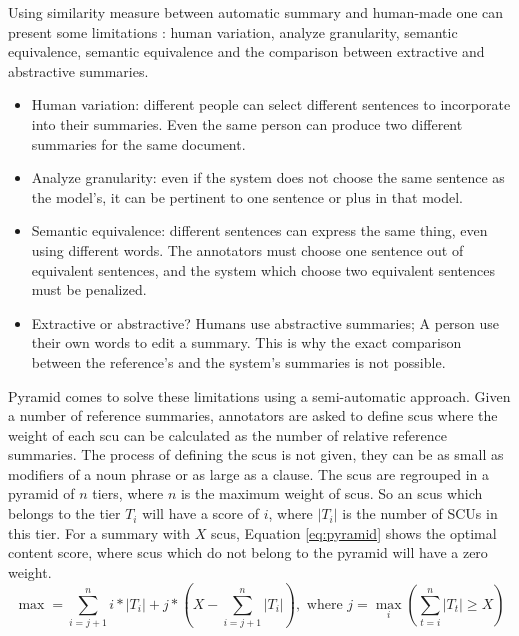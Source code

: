 Using similarity measure between automatic summary and human-made one can present some limitations \citep{07-nenkova-al}:
human variation, analyze granularity, semantic equivalence, semantic equivalence and the comparison between extractive and abstractive summaries.
\begin{itemize}
	\item Human variation: different people can select different sentences to incorporate into their summaries. 
	Even the same person can produce two different summaries for the same document.
	
	\item Analyze granularity: even if the system does not choose the same sentence as the model's, it can be pertinent to one sentence or plus in that model.
	
	\item Semantic equivalence: different sentences can express the same thing, even using different words.
	The annotators must choose one sentence out of equivalent sentences, and the system which choose two equivalent sentences must be penalized.
	
	\item Extractive or abstractive? Humans use abstractive summaries; A person use their own words to edit a summary.
	This is why the exact comparison between the reference's and the system's summaries is not possible.
	
\end{itemize}
Pyramid \citep{07-nenkova-al} comes to solve these limitations using a semi-automatic approach. 
Given a number of reference summaries, annotators are asked to define \acp{scu} where the weight of each \ac{scu} can be calculated as the number of relative reference summaries. 
The process of defining the \acp{scu} is not given, they can be as small as modifiers of a noun phrase or as large as a clause. 
The \acp{scu} are regrouped in a pyramid of $ n $ tiers, where $ n $ is the maximum weight of \acp{scu}. 
So an \acp{scu} which belongs to the tier $ T_i $ will have a score of $ i $, where $ |T_i| $ is the number of SCUs in this tier.
For a summary with $ X $ \acp{scu}, Equation \ref{eq:pyramid} shows the optimal content score, where \acp{scu} which do not belong to the pyramid will have a zero weight.
\begin{equation}
	\label{eq:pyramid}
	\max = \sum\limits_{i=j+1}^{n} i * |T_i| + j * (X - \sum\limits_{i=j+1}^{n} |T_i|),
	\text{ where } j = \max\limits_i (\sum\limits_{t = i}^{n} |T_t| \ge X)
\end{equation}

